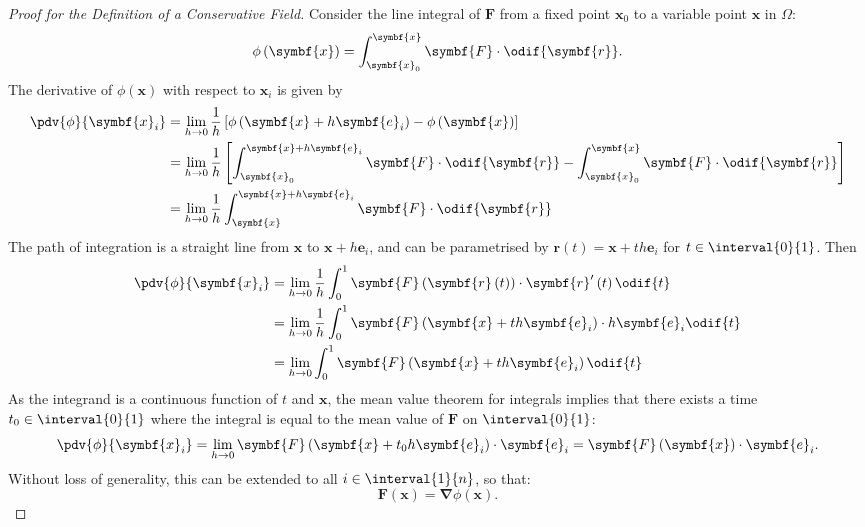 \documentclass{article}
\begin{document}
\begin{proof}[Proof for the Definition of a Conservative Field]
    Consider the line integral of \(\symbf{F}\) from a fixed point
    \(\symbf{x}_0\) to a variable point \(\symbf{x}\) in \(\Omega\):
    \begin{equation*}
        \phi\left( \symbf{x} \right) = \int_{\symbf{x}_0}^{\symbf{x}} \symbf{F} \cdot \odif{\symbf{r}}.
    \end{equation*}
    The derivative of \(\phi\left( \symbf{x} \right)\) with
    respect to \(\symbf{x}_i\) is given by
    \begin{align*}
        \pdv{\phi}{\symbf{x}_i} & = \lim_{h \to 0} \frac{1}{h} \left[ \phi\left( \symbf{x} + h \symbf{e}_i \right) - \phi\left( \symbf{x} \right) \right]                                                                       \\
                                & = \lim_{h \to 0} \frac{1}{h} \left[ \int_{\symbf{x}_0}^{\symbf{x} + h \symbf{e}_i} \symbf{F} \cdot \odif{\symbf{r}} - \int_{\symbf{x}_0}^{\symbf{x}} \symbf{F} \cdot \odif{\symbf{r}} \right] \\
                                & = \lim_{h \to 0} \frac{1}{h} \int_{\symbf{x}}^{\symbf{x} + h \symbf{e}_i} \symbf{F} \cdot \odif{\symbf{r}}
    \end{align*}
    The path of integration is a straight line from \(\symbf{x}\) to
    \(\symbf{x} + h \symbf{e}_i\), and can be parametrised by
    \(\symbf{r}\left( t \right) = \symbf{x} + t h \symbf{e}_i\) for
    \(t \in \interval{0}{1}\). Then
    \begin{align*}
        \pdv{\phi}{\symbf{x}_i} & = \lim_{h \to 0} \frac{1}{h} \int_0^1 \symbf{F}\left( \symbf{r}\left( t \right) \right) \cdot \symbf{r}'\left( t \right) \odif{t} \\
                                & = \lim_{h \to 0} \frac{1}{h} \int_0^1 \symbf{F}\left( \symbf{x} + t h \symbf{e}_i \right) \cdot h \symbf{e}_i \odif{t}            \\
                                & = \lim_{h \to 0} \int_0^1 \symbf{F}\left( \symbf{x} + t h \symbf{e}_i \right) \odif{t}
    \end{align*}
    As the integrand is a continuous function of \(t\) and \(\symbf{x}\),
    the mean value theorem for integrals implies that there exists a
    time \(t_0 \in \interval{0}{1}\) where the integral is equal to the
    mean value of \(\symbf{F}\) on \(\interval{0}{1}\):
    \begin{equation*}
        \pdv{\phi}{\symbf{x}_i} = \lim_{h \to 0} \symbf{F}\left( \symbf{x} + t_0 h \symbf{e}_i \right) \cdot \symbf{e}_i = \symbf{F}\left( \symbf{x} \right) \cdot \symbf{e}_i.
    \end{equation*}
    Without loss of generality, this can be extended to all \(i \in \interval{1}{n}\),
    so that:
    \begin{equation*}
        \symbf{F}\left( \symbf{x} \right) = \symbf{\nabla} \phi\left( \symbf{x} \right).
    \end{equation*}
\end{proof}
\end{document}

